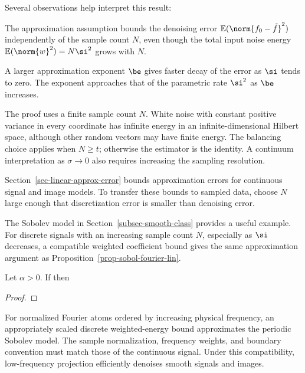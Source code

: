 Several observations help interpret this result:
\begin{rs}
	\item The approximation assumption bounds the denoising error $\mathbb E(\norm{f_0 - \tilde f}^2)$ independently of the sample count $N$, even though the total input noise energy $\mathbb E(\norm{w}^2)=N\si^2$ grows with $N$.
	\item A larger approximation exponent $\be$ gives faster decay of the error as $\si$ tends to zero. The exponent approaches that of the parametric rate $\si^2$ as $\be$ increases.
	\item The proof uses a finite sample count $N$. White noise with constant positive variance in every coordinate has infinite energy in an infinite-dimensional Hilbert space, although other random vectors may have finite energy. The balancing choice applies when $N\geq t$; otherwise the estimator is the identity. A continuum interpretation as $\sigma\to0$ also requires increasing the sampling resolution.
	\item Section~\ref{sec-linear-approx-error} bounds approximation errors for continuous signal and image models. To transfer these bounds to sampled data, choose $N$ large enough that discretization error is smaller than denoising error.
\end{rs}

The Sobolev model in Section~\ref{subsec-smooth-class} provides a useful example. For discrete signals with an increasing sample count $N$, especially as $\si$ decreases, a compatible weighted coefficient bound gives the same approximation argument as Proposition~\ref{prop-sobol-fourier-lin}.

\begin{prop}
	Let $\alpha>0$. If
	then
\end{prop}
\begin{proof}
\end{proof}

For normalized Fourier atoms ordered by increasing physical frequency, an appropriately scaled discrete weighted-energy bound approximates the periodic Sobolev model. The sample normalization, frequency weights, and boundary convention must match those of the continuous signal. Under this compatibility, low-frequency projection efficiently denoises smooth signals and images.

